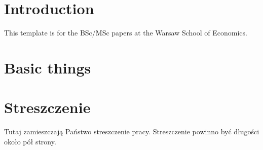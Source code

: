 \documentclass[english, twoside, 12pt, a4paper]{article}
\theoremstyle{definition}
\theoremstyle{plain}
\theoremstyle{remark}
\begin{document}
\cleardoublepage
\section{Introduction}

This template is for the BSc/MSc papers at the Warsaw School of Economics. 

\clearpage
\section{Basic things}


\clearpage
\printbibliography[heading=subbibliography,nottype=online,title={References}]
\printbibliography[heading=subbibliography,type=online,title={Online references}]


\clearpage
{}
\listoftables

\clearpage
{}
\listoffigures



\clearpage
{}
\section*{Streszczenie}

Tutaj zamieszczają Państwo streszczenie pracy. Streszczenie powinno być długości około pół strony.
\end{document}
